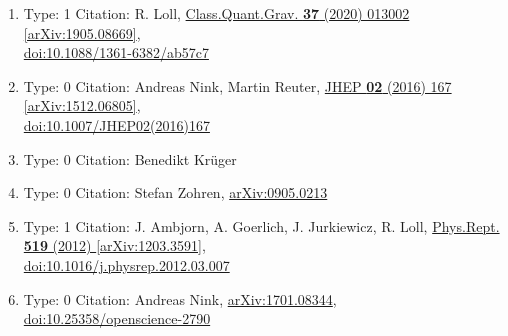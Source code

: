 \documentclass[a4paper,10pt]{article}
\begin{document}
\begin{enumerate}
\begin{enumerate}
  \item Type: 1 Citation: R. Loll, \href{https://www.doi.org/10.1088/1361-6382/ab57c7}{Class.Quant.Grav. {\bf 37} (2020) 013002}  \href{https://arxiv.org/abs/1905.08669}{[arXiv:1905.08669]},\\\href{https://www.doi.org/10.1088/1361-6382/ab57c7}{doi:10.1088/1361-6382/ab57c7}
  \item Type: 0 Citation: Andreas Nink, Martin Reuter, \href{https://www.doi.org/10.1007/JHEP02(2016)167}{JHEP {\bf 02} (2016) 167}  \href{https://arxiv.org/abs/1512.06805}{[arXiv:1512.06805]},\\\href{https://www.doi.org/10.1007/JHEP02(2016)167}{doi:10.1007/JHEP02(2016)167}
  \item Type: 0 Citation: Benedikt Krüger
  \item Type: 0 Citation: Stefan Zohren, \href{https://arxiv.org/abs/0905.0213}{arXiv:0905.0213}
  \item Type: 1 Citation: J. Ambjorn, A. Goerlich, J. Jurkiewicz, R. Loll, \href{https://www.doi.org/10.1016/j.physrep.2012.03.007}{Phys.Rept. {\bf 519} (2012) }  \href{https://arxiv.org/abs/1203.3591}{[arXiv:1203.3591]},\\\href{https://www.doi.org/10.1016/j.physrep.2012.03.007}{doi:10.1016/j.physrep.2012.03.007}
  \item Type: 0 Citation: Andreas Nink, \href{https://arxiv.org/abs/1701.08344}{arXiv:1701.08344},\\\href{https://www.doi.org/10.25358/openscience-2790}{doi:10.25358/openscience-2790}

\end{enumerate}
\end{enumerate}
\end{document}
